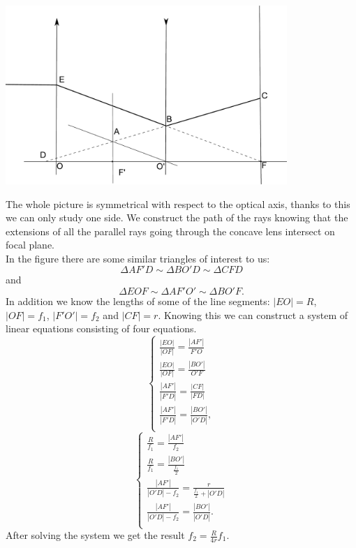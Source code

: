 \documentclass[11pt]{article}
\begin{document}
\solueng
\begin{center}
	\includegraphics[width=0.8\textwidth]{2013-v3g-01-laats_lah2}\\
\end{center}
The whole picture is symmetrical with respect to the optical axis, thanks to this we can only study one side. We construct the path of the rays knowing that the extensions of all the parallel rays going through the concave lens intersect on focal plane.\\
In the figure there are some similar triangles of interest to us:
$$\Delta AF'D \sim \Delta BO'D \sim \Delta CFD$$ 
and 
$$\Delta EOF \sim \Delta AF'O' \sim \Delta BO'F.$$ 
In addition we know the lengths of some of the line segments: $|EO| = R$, $|OF| = f_1$, $|F'O'| = f_2$ and $|CF| = r$. Knowing this we can construct a system of linear equations consisting of four equations.
\[ 
\begin{cases}
\frac{|EO|}{|OF|} = \frac{|AF'|}{F'O}\\
\frac{|EO|}{|OF|} = \frac{|BO'|}{O'F}\\
\frac{|AF'|}{|F'D|} = \frac{|CF|}{|FD|}\\
\frac{|AF'|}{|F'D|} = \frac{|BO'|}{|O'D|},\\
\end{cases}
\] 
\[ 
\begin{cases}
\frac{R}{f_1} = \frac{|AF'|}{f_2}\\
\frac{R}{f_1} = \frac{|BO'|}{\frac{f_1}{2}}\\
\frac{|AF'|}{|O'D| - f_2} = \frac{r}{\frac{f_1}{2} + |O'D|}\\
\frac{|AF'|}{|O'D| - f_2} = \frac{|BO'|}{|O'D|}.\\
\end{cases}
\]
After solving the system we get the result $f_2 = \frac{R}{4r}f_1$.\\
\end{document}
